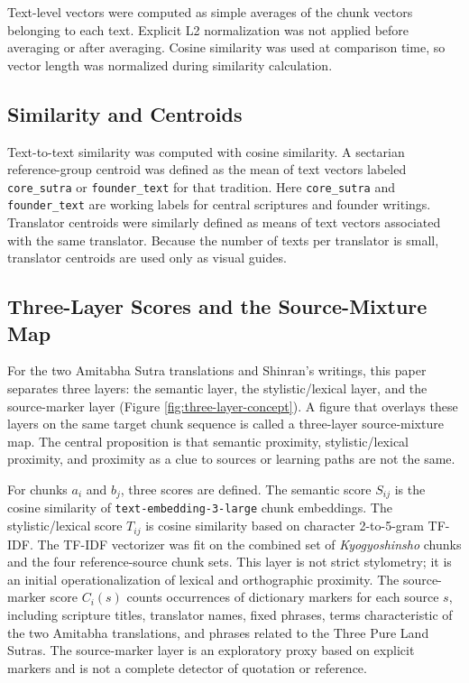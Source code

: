 \documentclass[uplatex,dvipdfmx,11pt,a4paper]{jsarticle}
\begin{document}
Text-level vectors were computed as simple averages of the chunk vectors belonging to each text. Explicit L2 normalization was not applied before averaging or after averaging. Cosine similarity was used at comparison time, so vector length was normalized during similarity calculation.

\subsection{Similarity and Centroids}

Text-to-text similarity was computed with cosine similarity. A sectarian reference-group centroid was defined as the mean of text vectors labeled \texttt{core\_sutra} or \texttt{founder\_text} for that tradition. Here \texttt{core\_sutra} and \texttt{founder\_text} are working labels for central scriptures and founder writings. Translator centroids were similarly defined as means of text vectors associated with the same translator. Because the number of texts per translator is small, translator centroids are used only as visual guides.

\subsection{Three-Layer Scores and the Source-Mixture Map}

For the two Amitabha Sutra translations and Shinran's writings, this paper separates three layers: the semantic layer, the stylistic/lexical layer, and the source-marker layer (Figure \ref{fig:three-layer-concept}). A figure that overlays these layers on the same target chunk sequence is called a three-layer source-mixture map. The central proposition is that semantic proximity, stylistic/lexical proximity, and proximity as a clue to sources or learning paths are not the same.

For chunks $a_i$ and $b_j$, three scores are defined. The semantic score $S_{ij}$ is the cosine similarity of \texttt{text-embedding-3-large} chunk embeddings. The stylistic/lexical score $T_{ij}$ is cosine similarity based on character 2-to-5-gram TF-IDF. The TF-IDF vectorizer was fit on the combined set of \textit{Kyogyoshinsho} chunks and the four reference-source chunk sets. This layer is not strict stylometry; it is an initial operationalization of lexical and orthographic proximity. The source-marker score $C_i(s)$ counts occurrences of dictionary markers for each source $s$, including scripture titles, translator names, fixed phrases, terms characteristic of the two Amitabha translations, and phrases related to the Three Pure Land Sutras. The source-marker layer is an exploratory proxy based on explicit markers and is not a complete detector of quotation or reference.
\end{document}
